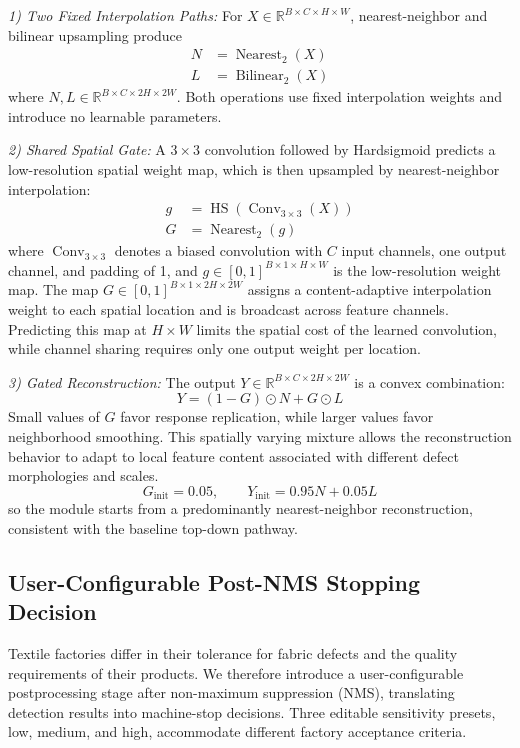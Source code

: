 \documentclass[journal]{IEEEtranTIE}
\begin{document}
\emph{1) Two Fixed Interpolation Paths:}
For $X\in\mathbb{R}^{B\times C\times H\times W}$, nearest-neighbor and bilinear upsampling produce
\begin{align}
N &= \operatorname{Nearest}_{2}(X) \label{eq:giu-paths}\\
L &= \operatorname{Bilinear}_{2}(X) \label{eq:giu-bilinear}
\end{align}
\noindent where $N,L\in\mathbb{R}^{B\times C\times2H\times2W}$. Both operations use fixed interpolation weights and introduce no learnable parameters.

\emph{2) Shared Spatial Gate:}
A $3\times3$ convolution followed by Hardsigmoid predicts a low-resolution spatial weight map, which is then upsampled by nearest-neighbor interpolation:
\begin{align}
g &= \operatorname{HS}(\operatorname{Conv}_{3\times3}(X)) \label{eq:giu-gate-lowres}\\
G &= \operatorname{Nearest}_{2}(g) \label{eq:giu-gate}
\end{align}
\noindent where $\operatorname{Conv}_{3\times3}$ denotes a biased convolution with $C$ input channels, one output channel, and padding of 1, and $g\in[0,1]^{B\times1\times H\times W}$ is the low-resolution weight map. The map $G\in[0,1]^{B\times1\times2H\times2W}$ assigns a content-adaptive interpolation weight to each spatial location and is broadcast across feature channels. Predicting this map at $H\times W$ limits the spatial cost of the learned convolution, while channel sharing requires only one output weight per location.

\emph{3) Gated Reconstruction:}
The output $Y\in\mathbb{R}^{B\times C\times2H\times2W}$ is a convex combination:
\begin{equation}
Y=(1-G)\odot N+G\odot L
\label{eq:giu-mixture}
\end{equation}
\noindent Small values of $G$ favor response replication, while larger values favor neighborhood smoothing. This spatially varying mixture allows the reconstruction behavior to adapt to local feature content associated with different defect morphologies and scales.
\begin{equation}
G_{\mathrm{init}}=0.05,\qquad Y_{\mathrm{init}}=0.95N+0.05L
\label{eq:giu-initialization}
\end{equation}
\noindent so the module starts from a predominantly nearest-neighbor reconstruction, consistent with the baseline top-down pathway.

\subsection{User-Configurable Post-NMS Stopping Decision}
\label{sec:stop-rules}
Textile factories differ in their tolerance for fabric defects and the quality requirements of their products. We therefore introduce a user-configurable postprocessing stage after non-maximum suppression (NMS), translating detection results into machine-stop decisions. Three editable sensitivity presets, low, medium, and high, accommodate different factory acceptance criteria.
\end{document}
